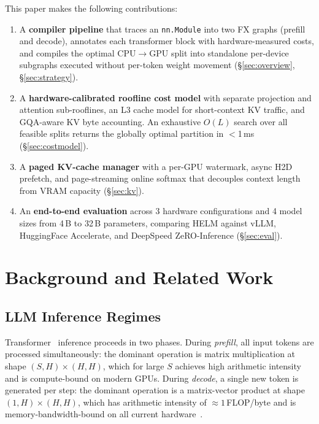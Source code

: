 \documentclass[lettersize,journal]{IEEEtran}
\begin{document}
This paper makes the following contributions:

\begin{enumerate}
  \item A \textbf{compiler pipeline} that traces an \texttt{nn.Module} into
        two FX graphs (prefill and decode), annotates each transformer block
        with hardware-measured costs, and compiles the optimal CPU$\to$GPU
        split into standalone per-device subgraphs executed without
        per-token weight movement (\S\ref{sec:overview}, \S\ref{sec:strategy}).
  \item A \textbf{hardware-calibrated roofline cost model} with separate
        projection and attention sub-rooflines, an L3 cache model for
        short-context KV traffic, and GQA-aware KV byte accounting.
        An exhaustive $O(L)$ search over all feasible splits returns the
        globally optimal partition in $<$1\,ms (\S\ref{sec:costmodel}).
  \item A \textbf{paged KV-cache manager} with a per-GPU watermark,
        async H2D prefetch, and page-streaming online softmax that
        decouples context length from VRAM capacity (\S\ref{sec:kv}).
  \item An \textbf{end-to-end evaluation} across 3 hardware
        configurations and 4 model sizes from 4\,B to 32\,B parameters,
        comparing HELM against vLLM, HuggingFace Accelerate, and DeepSpeed
        ZeRO-Inference (\S\ref{sec:eval}).
\end{enumerate}

\section{Background and Related Work}
\label{sec:related}

\subsection{LLM Inference Regimes}

Transformer~\cite{attention} inference proceeds in two phases. During
\emph{prefill}, all input tokens are processed simultaneously: the dominant
operation is matrix multiplication at shape $(S, H) \times (H, H)$, which
for large $S$ achieves high arithmetic intensity and is compute-bound on
modern GPUs. During \emph{decode}, a single new token is generated per step:
the dominant operation is a matrix-vector product at shape $(1, H) \times
(H, H)$, which has arithmetic intensity of $\approx 1$\,FLOP/byte and is
memory-bandwidth-bound on all current hardware~\cite{roofline}.
\end{document}
